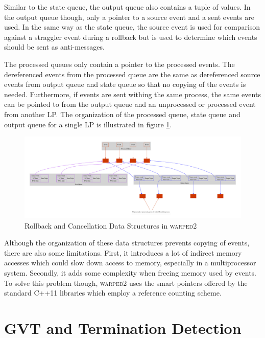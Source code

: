 \documentclass[11pt]{book}
\begin{document}
Similar to the state queue, the output queue also contains a tuple of values. In the output
queue though, only a pointer to a source event and a sent events are used. In the same way
as the state queue, the source event is used for comparison against a straggler event during
a rollback but is used to determine which events should be sent as anti-messages.

The processed queues only contain a pointer to the processed events. The dereferenced events
from the processed queue are the same as dereferenced source events from output queue and state
queue so that no copying of the events is needed. Furthermore, if events are sent withing the
same process, the same events can be pointed to from the output queue and an unprocessed or
processed event from another LP. The organization of the processed queue, state queue and output
queue for a single LP is illustrated in figure \ref{rollback_ds}.

\begin{figure}[H]
    \centering
    \includegraphics[width=\textwidth,quiet]{figs/graphviz/rollback_ds.pdf}
    \caption{Rollback and Cancellation Data Structures in \textsc{warped2}}\label{rollback_ds}
\end{figure}

Although the organization of these data structures prevents copying of events, there are also
some limitations. First, it introduces a lot of indirect memory accesses which could slow down
access to memory, especially in a multiprocessor system. Secondly, it adds some complexity
when freeing memory used by events. To solve this problem though, \textsc{warped2} uses the
smart pointers offered by the standard C++11 libraries which employ a reference counting
scheme.



\chapter{GVT and Termination Detection}\label{gvt_termination}
\end{document}
